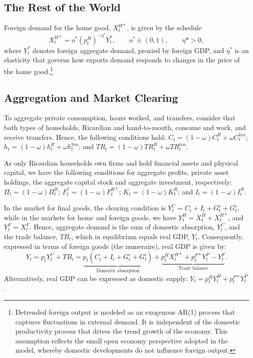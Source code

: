 \documentclass[12pt]{article}
\begin{document}
\subsection{The Rest of the World}

Foreign demand for the home good, $X_{t}^{H\ast }$, is given by the schedule%
\begin{equation*}
X_{t}^{H\ast }=o^{\ast }\left(p_t^H\right)^{-\eta^*}Y_{t}^{\ast },\qquad o^{\ast }\in (0,1), \qquad \eta\ast >0,
\end{equation*}%
where $Y_{t}^{\ast }$ denotes foreign aggregate demand, proxied by foreign GDP, and $\eta^*$ is an elasticity that governs how exports demand responds to changes in the price of the home good.\footnote{Detrended foreign output is modeled as an exogenous AR(1) process that captures fluctuations in external demand. It is independent of the domestic productivity process that drives the trend growth of the economy. This assumption reflects the small open economy perspective adopted in the model, whereby domestic developments do not influence foreign output.}

\subsection{Aggregation and Market Clearing}

To aggregate private consumption, hours worked, and transfers, consider that both types of households, Ricardian and hand-to-mouth, consume and work, and receive transfers. Hence, the following conditions hold: $C_t=(1-\omega)C_t^R+\omega C_t^{hm}$; $h_t=(1-\omega)h_t^R+\omega h_t^{hm}$; and $TR_t=(1-\omega)TR_t^R+\omega TR_t^{hm}$.

As only Ricardian households own firms and hold financial assets and physical capital, we have the following conditions for aggregate profits, private asset holdings, the aggregate capital stock and aggregate investment, respectively: $\Pi_t= (1-\omega)\Pi_t^R$; $F^{\ast}_t=(1-\omega)F_t^{R\ast}$; $K_t=(1-\omega)K_t^R$; and $I_t=(1-\omega)I_t^R$.

In the market for final goods, the clearing condition is $Y_{t}^{C}=C_{t}+I_{t}+G^c_{t} +G^i_{t}$, while in the markets for home and foreign goods, we have $Y_{t}^{H}=X_{t}^{H}+X_{t}^{H\ast }$, and $Y_{t}^{F}=X_{t}^{F}$. Hence, aggregate demand is the sum of domestic absorption, $Y_{t}^{C}$, and the trade balance, $TB_t$, which in equilibrium equals real GDP, $Y_t$. Consequently, expressed in terms of foreign goods (the numeraire), real GDP is given by:
\begin{equation*}
Y_{t} = p_tY_t^C+TB_t=\underbrace{p_t(C_{t}+I_{t}+G^c_{t} +G^i_{t})}_{\text{Domestic absorption}}+\underbrace{p_t^H X_{t}^{H\ast }+p_t^{P\ast}Y_{t}^{P}-Y_{t}^F}_{\text{Trade balance}}.
\end{equation*}
Alternatively, real GDP can be expressed as domestic supply: $Y_t = p_t^H Y_t^H + p_{t}^{P\ast }Y_{t}^{P}$.
\end{document}
